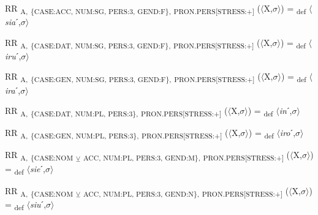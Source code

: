 {\begin{exe}
 RR \textsubscript{A,} \textsubscript{\{CASE:ACC, NUM:SG, PERS:3, GEND:F\},} \textsubscript{PRON.PERS[STRESS:+]} ($\langle$X,$\sigma $$\rangle$) = \textsubscript{def} $\langle$\textit{sia}ˊ,$\sigma $$\rangle$
\end{exe}

\begin{exe}
 RR \textsubscript{A,} \textsubscript{\{CASE:DAT, NUM:SG, PERS:3, GEND:F\},} \textsubscript{PRON.PERS[STRESS:+]} ($\langle$X,$\sigma $$\rangle$) = \textsubscript{def} $\langle$\textit{iru}ˊ,$\sigma $$\rangle$
\end{exe}

\begin{exe}
 RR \textsubscript{A,} \textsubscript{\{CASE:GEN, NUM:SG, PERS:3, GEND:F\},} \textsubscript{PRON.PERS[STRESS:+]} ($\langle$X,$\sigma $$\rangle$) = \textsubscript{def} $\langle$\textit{ira}ˊ,$\sigma $$\rangle$
\end{exe}

\begin{exe}
 RR \textsubscript{A,} \textsubscript{\{CASE:DAT, NUM:PL, PERS:3\},} \textsubscript{PRON.PERS[STRESS:+]} ($\langle$X,$\sigma $$\rangle$) = \textsubscript{def} $\langle$\textit{in}ˊ,$\sigma $$\rangle$
\end{exe}

\begin{exe}
 RR \textsubscript{A,} \textsubscript{\{CASE:GEN, NUM:PL, PERS:3\},} \textsubscript{PRON.PERS[STRESS:+]} ($\langle$X,$\sigma $$\rangle$) = \textsubscript{def} $\langle$\textit{iro}ˊ,$\sigma $$\rangle$
\end{exe}

\begin{exe}
 RR \textsubscript{A,} \textsubscript{\{CASE:NOM} \textsubscript{${\veebar}$} \textsubscript{ACC, NUM:PL, PERS:3, GEND:M\},} \textsubscript{PRON.PERS[STRESS:+]} ($\langle$X,$\sigma $$\rangle$) = \textsubscript{def} $\langle$\textit{sie}ˊ,$\sigma $$\rangle$
\end{exe}

\begin{exe}
 RR \textsubscript{A,} \textsubscript{\{CASE:NOM} \textsubscript{${\veebar}$} \textsubscript{ACC, NUM:PL, PERS:3, GEND:N\},} \textsubscript{PRON.PERS[STRESS:+]} ($\langle$X,$\sigma $$\rangle$) = \textsubscript{def} $\langle$\textit{siu}ˊ,$\sigma $$\rangle$
\end{exe}

}
